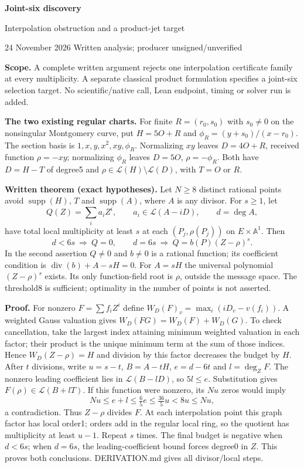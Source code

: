 \documentclass[10pt]{article}
\newcommand{\LL}{\mathcal L}
\begin{document}
{\LARGE\bf Joint-six discovery}\par
{\large Interpolation obstruction and a product-jet target}\par
24 November 2026 \hfill Written analysis; producer unsigned/unverified

\textbf{Scope.} A complete written argument rejects one interpolation
certificate family at every multiplicity. A separate classical product
formulation specifies a joint-six selection target. No scientific/native
call, Lean endpoint, timing or solver run is added.

\textbf{The two existing regular charts.}
For finite $R=(r_0,s_0)$ with $s_0\ne0$ on the nonsingular Montgomery curve,
put $H=5O+R$ and $\phi_R=(y+s_0)/(x-r_0)$. The section basis is
$1,x,y,x^2,xy,\phi_R$. Normalizing $xy$ leaves $D=4O+R$, received
function $\rho=-xy$; normalizing $\phi_R$ leaves $D=5O$,
$\rho=-\phi_R$. Both have $D=H-T$ of degree5 and
$\rho\in\LL(H)\setminus\LL(D)$, with $T=O$ or $R$.

\textbf{Written theorem (exact hypotheses).}
Let $N\ge8$ distinct rational points avoid $\operatorname{supp}(H)$,
$T$ and $\operatorname{supp}(A)$, where $A$ is any divisor. For $s\ge1$,
let
\[
 Q(Z)=\sum_i a_i Z^i,\qquad a_i\in\LL(A-iD),\qquad d=\deg A,
\]
have total local multiplicity at least $s$ at each
$(P_j,\rho(P_j))$ on $E\times\mathbb A^1$. Then
\[
 \boxed{d<6s\ \Longrightarrow\ Q=0,\qquad
 d=6s\ \Longrightarrow\ Q=b(P)(Z-\rho)^s.}
\]
In the second assertion $Q\ne0$ and $b\ne0$ is a rational function;
its coefficient condition is $\operatorname{div}(b)+A-sH=0$.
For $A=sH$ the universal polynomial $(Z-\rho)^s$ exists. Its only
function-field root is $\rho$, outside the message space. The threshold8
is sufficient; optimality in the number of points is not asserted.

\textbf{Proof.}
For nonzero $F=\sum f_iZ^i$ define
$W_D(F)_v=\max_i(iD_v-v(f_i))$. A weighted Gauss valuation gives
$W_D(FG)=W_D(F)+W_D(G)$. To check cancellation, take the largest index
attaining minimum weighted valuation in each factor; their product is
the unique minimum term at the sum of those indices. Hence
$W_D(Z-\rho)=H$ and division by this factor decreases the budget by $H$.
After $t$ divisions, write $u=s-t$, $B=A-tH$, $e=d-6t$ and
$l=\deg_Z F$. The nonzero leading coefficient lies in $\LL(B-lD)$,
so $5l\le e$. Substitution gives $F(\rho)\in\LL(B+lT)$.
If this function were nonzero, its $Nu$ zeros would imply
\[
 Nu\le e+l\le \tfrac65 e\le \tfrac{36}{5}u<8u\le Nu,
\]
a contradiction. Thus $Z-\rho$ divides $F$. At each interpolation point
this graph factor has local order1; orders add in the regular local
ring, so the quotient has multiplicity at least $u-1$.
Repeat $s$ times. The final budget is negative when $d<6s$;
when $d=6s$, the leading-coefficient bound forces degree0 in $Z$.
This proves both conclusions. DERIVATION.md gives all divisor/local steps.
\end{document}
